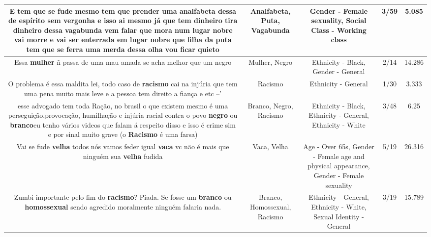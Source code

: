 \documentclass[11pt]{article}
\newlength\mylength
\begin{document}
\begin{center}
\begin{longtable}{|C{.65\mylength}|C{.30\mylength}|C{.12\mylength}|C{.12\mylength}|C{.12\mylength}|}
  \small E tem que se fude mesmo tem que prender uma \textbf{analfabeta} dessa de espírito sem vergonha  e isso ai mesmo já que tem dinheiro tira dinheiro dessa \textbf{vagabunda} vem falar que mora num lugar nobre vai morre e vai ser enterrada em lugar nobre que filha da \textbf{puta} tem que se ferra uma merda dessa olha vou ficar quieto\normalsize   & Analfabeta, Puta, Vagabunda & Gender - Female sexuality, Social Class - Working class & 3/59 & 5.085 \\  \hline
  \small Essa \textbf{mulher} ñ passa de uma mau amada se acha melhor que um negro\normalsize   & Mulher, Negro & Ethnicity - Black, Gender - General & 2/14 & 14.286 \\  \hline
  \small O problema é essa maldita lei, todo caso de \textbf{racismo} cai na injúria que tem uma pena muito mais leve e a pessoa tem direito a fiança e etc --'\normalsize   & Racismo & Ethnicity - General & 1/30 & 3.333 \\  \hline
  \small esse advogado tem toda Ração, no brasil o que existem mesmo é uma perseguição,provocação, humilhação e injúria racial contra o povo \textbf{negro} ou \textbf{branco}eu tenho vários videos que falam á respeito disso e isso é crime sim e por sinal muito grave  (o \textbf{Racismo} é uma farsa)\normalsize   & Branco, Negro, Racismo & Ethnicity - Black, Ethnicity - General, Ethnicity - White & 3/48 & 6.25 \\  \hline
  \small Vai se fude \textbf{v\textbf{elha}} todos nós vamos feder igual \textbf{vaca} vc não é mais que ninguém sua \textbf{v\textbf{elha}} fudida\normalsize   & Vaca, Velha & Age - Over 65s, Gender - Female age and physical appearance, Gender - Female sexuality & 5/19 & 26.316 \\  \hline
  \small Zumbi importante pelo fim do \textbf{racismo}? Piada. Se fosse um \textbf{branco} ou \textbf{homossexual} sendo agredido moralmente ninguém falaria nada.\normalsize   & Branco, Homossexual, Racismo & Ethnicity - General, Ethnicity - White, Sexual Identity - General & 3/19 & 15.789 \\  \hline

\end{longtable}
\end{center}
\end{document}
